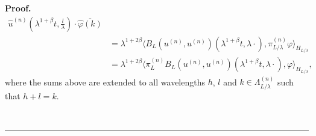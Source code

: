 \documentclass[11pt]{preprint}
\newenvironment{proof}[1][Proof]{\textbf{#1.} }{\ \rule{0.5em}{0.5em}}
\begin{document}
\begin{proof}
\begin{align*}
  \widehat{u}^{(n)}(\lambda^{1+\beta}t,\frac{l}{\lambda})\cdot\overline{\widehat{\varphi}(k)}\\
&=\lambda^{1+2\beta}\langle B_L(u^{(n)},u^{(n)})(\lambda^{1+\beta}t,\lambda\cdot),
  \pi^{(n)}_{{L/\lambda}}\varphi\rangle_{H_{{L/\lambda}}}\\
&=\lambda^{1+2\beta}\langle\pi^{(n)}_LB_L(u^{(n)},u^{(n)})
  (\lambda^{1+\beta}t,\lambda\cdot),\varphi\rangle_{H_{{L/\lambda}}},
\end{align*}
where the sums above are extended to all wavelengths $h$, $l$ and $k\in\Lambda^{(n)}_{{L/\lambda}}$
such that $h+l=k$.

\end{proof}
\end{document}
